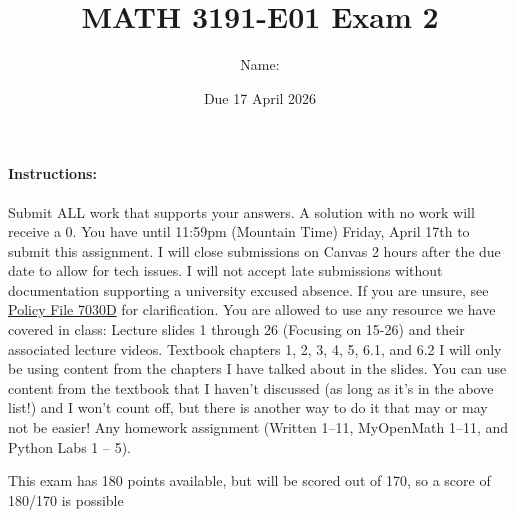 \documentclass[12pt,addpoints]{exam}
\title{MATH 3191-E01 Exam 2}
\date{Due 17 April 2026}
\author{Name: \rule{150pt}{1pt}}
\begin{document}
   \maketitle

    \paragraph{Instructions:} Submit ALL work that supports your answers. A solution with no work will
    receive a $0$. You have until 11:59pm (Mountain Time) Friday, April 17th to submit this assignment.
    I will close submissions on Canvas 2 hours after the due date to allow for tech issues. I will not
    accept late submissions without documentation supporting a university excused absence. If you are
    unsure, see \href{https://www.ucdenver.edu/docs/librariesprovider284/default-document-library/7030d---student-attendance-and-absences---cu-denver02fbb186-4b01-4e15-af21-2ab4bbaac065.pdf?sfvrsn=f1001eb4_1}
    {Policy File 7030D} for clarification. You are allowed to use any resource we have covered in
    class: Lecture slides 1 through 26 (Focusing on 15-26) and their associated lecture videos.
    Textbook chapters 1, 2, 3, 4, 5, 6.1, and 6.2
    I will only be using content from the chapters I have talked about in the slides. You can use content from the
    textbook that I haven't discussed (as long as it's in the above list!) and I won't count off,
    but there is another way to do it that may or may not be easier! Any homework assignment
    (Written 1--11, MyOpenMath 1--11, and Python Labs 1 -- 5).

    This exam has 180 points available, but will be scored out of 170, so a score of 180/170 is possible
\end{document}
